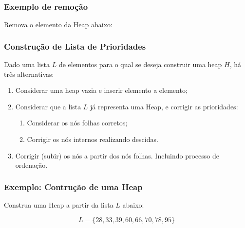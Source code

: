 \documentclass[10pt]{beamer}
\begin{document}
\begin{frame}[t]
    \frametitle{Exemplo de remoção}
    \large
    Remova o elemento da Heap abaixo:

    \centering
\end{frame}


\begin{frame}[t]
    \frametitle{Construção de Lista de Prioridades}
    \large
    Dado uma lista $L$ de elementos para o qual se deseja construir uma heap $H$, há três alternativas:\vspace*{1em}
    \begin{enumerate}[<+-|alert@+>]
        \large\setlength{\itemsep}{1em}
        \item Considerar uma heap vazia e inserir elemento a elemento;
        \item Considerar que a lista $L$ já representa uma Heap, e corrigir as prioridades:\vspace*{1em}
              \begin{enumerate}
                  \large\setlength{\itemsep}{1em}
                  \item Considerar os nós folhas corretos;
                  \item Corrigir os nós internos realizando descidas.
              \end{enumerate}
        \item Corrigir (subir) os nós a partir dos nós folhas. Incluindo processo de ordenação.
    \end{enumerate}
\end{frame}

\begin{frame}[t]
    \frametitle{Exemplo: Contrução de uma Heap}
    \large
    Construa uma Heap a partir da lista $L$ abaixo:

    $$L =\{28,33,39,60,66,70,78,95\}$$


\end{frame}
\end{document}
